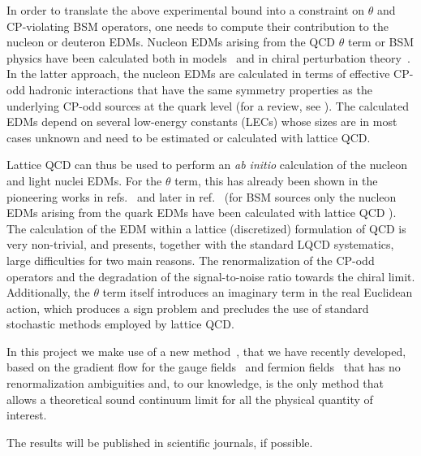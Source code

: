 \documentclass[aps,prc,twocolumn,showpacs,floatfix,nofootinbib,preprintnumbers,superscriptaddress,amsmath,amssymb]{revtex4-1}
\begin{document}
In order to translate the above experimental bound into a constraint on
$\theta$ and CP-violating BSM operators, one needs to compute their contribution to 
the nucleon or deuteron EDMs.
Nucleon EDMs arising from the QCD $\theta$ term or BSM physics have been calculated both in 
models~\cite{Pospelov:2005pr} and in chiral perturbation theory~\cite{Ottnad:2009jw,Mereghetti:2010kp}. 
In the latter approach, the nucleon EDMs are calculated 
in terms of effective CP-odd hadronic interactions that have the same symmetry properties 
as the underlying CP-odd sources at the quark level (for a review, see \cite{Mereghetti:2015rra}). 
The calculated EDMs depend on several low-energy constants (LECs) whose sizes are in most 
cases unknown and need to be estimated or calculated with lattice QCD.
 
Lattice QCD can thus be used to perform an {\it ab initio} calculation of the nucleon 
and light nuclei EDMs.
For the $\theta$ term, this has already been shown in the pioneering works 
in refs.~\cite{Shintani:2005xg,Berruto:2005hg} and later in ref.~\cite{Shintani:2008nt,Aoki:2008gv} 
(for BSM sources only the nucleon EDMs arising from the quark EDMs have been calculated 
with lattice QCD \cite{Bhattacharya:2015esa}).
The calculation of the EDM within a lattice (discretized) formulation of QCD 
is very non-trivial, and presents, together with the standard LQCD systematics, large difficulties for two main reasons. 
The renormalization of the CP-odd operators and the degradation of the signal-to-noise ratio towards the chiral limit.
Additionally, the $\theta$ term itself introduces an imaginary term in the real Euclidean action,
which produces a sign problem and precludes the use of standard stochastic methods employed by lattice QCD.  

In this project we make use of a new method~\cite{Shindler:2014oha,Shindler:2015aqa},
that we have recently developed, based on the gradient flow for the gauge
fields~\cite{Luscher:2010iy} and fermion fields~\cite{Luscher:2013cpa} that has no renormalization ambiguities 
and, to our knowledge, is the only method that allows a theoretical sound continuum limit
for all the physical quantity of interest.

The results will be published in scientific journals, if possible.
\end{document}
